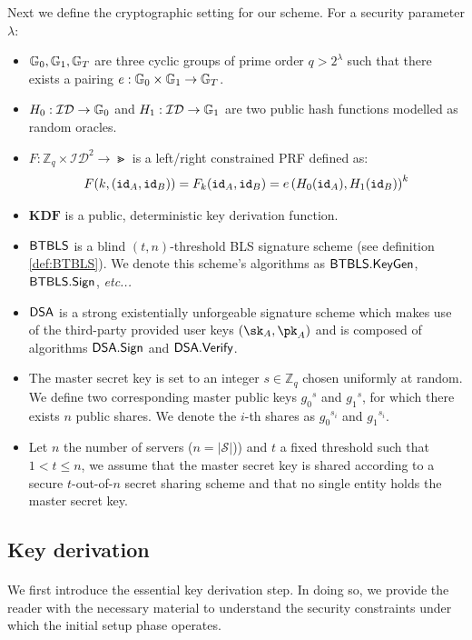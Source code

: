 		\noindent Next we define the cryptographic setting for our scheme. For a security parameter $\lambda$:
		\begin{itemize}
			\item $\mathbb{G}_0, \mathbb{G}_1, \mathbb{G}_T$ are three cyclic groups of prime order $q > 2^{\lambda}$ such that there exists a pairing $e : \mathbb{G}_0 \times \mathbb{G}_1 \rightarrow \mathbb{G}_T$.
			\item $H_0: \mathcal{ID}\rightarrow \mathbb{G}_0$  and $H_1: \mathcal{ID} \rightarrow \mathbb{G}_1$ are two public hash functions modelled as random oracles.
			\item $F: \mathbb{Z}_q \times \mathcal{ID}^2  \rightarrow \Gt$ is a left/right constrained PRF defined as: \begin{equation}
				F(k, (\mathtt{id}_A, \mathtt{id}_B)) = F_k(\mathtt{id}_A, \mathtt{id}_B)= e\left(H_0(\mathtt{id}_A), H_1(\mathtt{id}_B) \right)^k
			\end{equation}
			\item $\mathbf{KDF}$ is a public, deterministic key derivation function.
			\item $\mathsf{BTBLS}$ is a blind $(t,n)$-threshold BLS signature scheme (see definition \autoref{def:BTBLS}). We denote this scheme's algorithms as $\mathsf{BTBLS} . \mathsf{KeyGen}$, $\mathsf{BTBLS} . \mathsf{Sign}$, \textit{etc...} 
			\item $\mathsf{DSA}$ is a strong existentially unforgeable signature scheme which makes use of the third-party provided user keys $(\sk_A,\pk_A)$ and is composed of algorithms $\mathsf{DSA} . \mathsf{Sign}$ and $\mathsf{DSA} . \mathsf{Verify}$.
			\item The master secret key is set to an integer $s \in \mathbb{Z}_q$ chosen uniformly at random. We define two corresponding master public keys ${g_0}^s$ and ${g_1}^s$, for which there exists $n$ public shares. We denote the $i$-th shares as ${g_0}^{s_i}$ and ${g_1}^{s_i}$.
			\item Let $n$ the number of servers ($n=|\mathcal{S}|$)) and $t$ a fixed threshold such that $1 < t \leq n$, we assume that the master secret key is shared according to a secure $t$-out-of-$n$ secret sharing scheme and that no single entity holds the master secret key.
		\end{itemize}

	\subsection{Key derivation}
	
		\paragraph{} We first introduce the essential key derivation step. In doing so, we provide the reader with the necessary material to understand the security constraints under which the initial setup phase operates.
		
